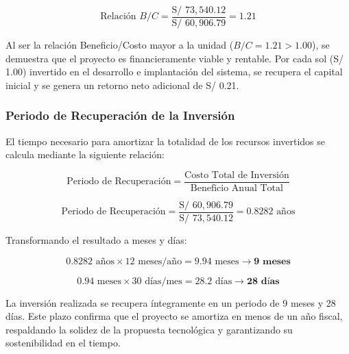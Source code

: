 \begin{equation*}
    \text{Relación } B/C = \frac{\text{S/ } 73,540.12}{\text{S/ } 60,906.79} = \mathbf{1.21}
\end{equation*}

\noindent
Al ser la relación Beneficio/Costo mayor a la unidad ($B/C = 1.21 > 1.00$), 
se demuestra que el proyecto es financieramente viable y rentable. Por cada sol (S/ 1.00) 
invertido en el desarrollo e implantación del sistema, se recupera el capital inicial y se genera un retorno neto adicional de S/ 0.21.

\subsubsection{Periodo de Recuperación de la Inversión}

El tiempo necesario para amortizar la totalidad de los recursos invertidos se calcula mediante la siguiente relación:

\begin{equation}
    \text{Periodo de Recuperación} = \frac{\text{Costo Total de Inversión}}{\text{Beneficio Anual Total}}
\end{equation}

\begin{equation*}
    \text{Periodo de Recuperación} = \frac{\text{S/ } 60,906.79}{\text{S/ } 73,540.12} = 0.8282\text{ años}
\end{equation*}

Transformando el resultado a meses y días:

\begin{equation*}
    0.8282\text{ años} \times 12\text{ meses/año} = 9.94\text{ meses} \longrightarrow \mathbf{9\text{ meses}}
\end{equation*}

\begin{equation*}
    0.94\text{ meses} \times 30\text{ días/mes} = 28.2\text{ días} \longrightarrow \mathbf{28\text{ días}}
\end{equation*}

\noindent
La inversión realizada se recupera íntegramente en un periodo de 9 meses y 28 días. 
Este plazo confirma que el proyecto se amortiza en menos de un año fiscal, 
respaldando la solidez de la propuesta tecnológica y garantizando su sostenibilidad en el tiempo.